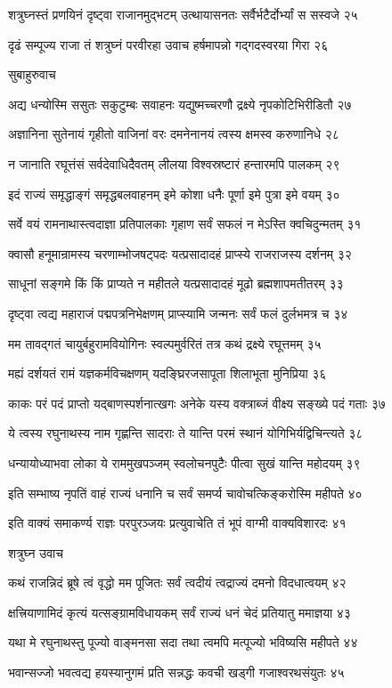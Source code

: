 शत्रुघ्नस्तं प्रणयिनं दृष्ट्वा राजानमुद्भटम्
उत्थायासनतः सर्वैर्भटैर्दोर्भ्यां स सस्वजे २५

दृढं सम्पूज्य राजा तं शत्रुघ्नं परवीरहा
उवाच हर्षमापन्नो गद्गदस्वरया गिरा २६

सुबाहुरुवाच

अद्य धन्योस्मि ससुतः सकुटुम्बः सवाहनः
यद्युष्मच्चरणौ द्रक्ष्ये नृपकोटिभिरीडितौ २७

अज्ञानिना सुतेनायं गृहीतो वाजिनां वरः
दमनेनानयं त्वस्य क्षमस्व करुणानिधे २८

न जानाति रघूत्तंसं सर्वदेवाधिदैवतम्
लीलया विश्वस्रष्टारं हन्तारमपि पालकम् २९

इदं राज्यं समृद्धाङ्गं समृद्धबलवाहनम्
इमे कोशा धनैः पूर्णा इमे पुत्रा इमे वयम् ३०

सर्वे वयं रामनाथास्त्वदाज्ञा प्रतिपालकाः
गृहाण सर्वं सफलं न मेऽस्ति क्वचिदुन्मतम् ३१

क्वासौ हनूमान्रामस्य चरणाम्भोजषट्पदः
यत्प्रसादादहं प्राप्स्ये राजराजस्य दर्शनम् ३२

साधूनां सङ्गमे किं किं प्राप्यते न महीतले
यत्प्रसादादहं मूढो ब्रह्मशापमतीतरम् ३३

दृष्ट्वा त्वद्य महाराजं पद्मपत्रनिभेक्षणम्
प्राप्स्यामि जन्मनः सर्वं फलं दुर्लभमत्र च ३४

मम तावद्गतं चायुर्बहुरामवियोगिनः
स्वल्पमुर्वरितं तत्र कथं द्रक्ष्ये रघूत्तमम् ३५

मह्यं दर्शयतं रामं यज्ञकर्मविचक्षणम्
यदङ्घ्रिरजसापूता शिलाभूता मुनिप्रिया ३६

काकः परं पदं प्राप्तो यद्बाणस्पर्शनात्खगः
अनेके यस्य वक्त्राब्जं वीक्ष्य सङ्ख्ये पदं गताः ३७

ये त्वस्य रघुनाथस्य नाम गृह्णन्ति सादराः
ते यान्ति परमं स्थानं योगिभिर्यद्विचिन्त्यते ३८

धन्यायोध्याभवा लोका ये राममुखपञ्जम्
स्वलोचनपुटैः पीत्वा सुखं यान्ति महोदयम् ३९

इति सम्भाष्य नृपतिं वाहं राज्यं धनानि च
सर्वं समर्प्य चावोचत्किङ्करोस्मि महीपते ४०

इति वाक्यं समाकर्ण्य राज्ञः परपुरञ्जयः
प्रत्युवाचेति तं भूपं वाग्मी वाक्यविशारदः ४१

शत्रुघ्न उवाच

कथं राजन्निदं ब्रूषे त्वं वृद्धो मम पूजितः
सर्वं त्वदीयं त्वद्राज्यं दमनो विदधात्वयम् ४२

क्षत्त्रियाणामिदं कृत्यं यत्सङ्ग्रामविधायकम्
सर्वं राज्यं धनं चेदं प्रतियातु ममाज्ञया ४३

यथा मे रघुनाथस्तु पूज्यो वाङ्मनसा सदा
तथा त्वमपि मत्पूज्यो भविष्यसि महीपते ४४

भवान्सज्जो भवत्वद्य हयस्यानुगमं प्रति
सन्नद्धः कवची खड्गी गजाश्वरथसंयुतः ४५

